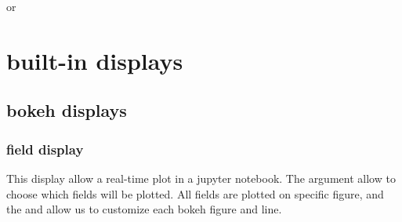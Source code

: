 \documentclass[letterpaper,10pt,english]{sphinxmanual}
\begin{document}
or

\begin{sphinxVerbatim}[commandchars=\\\{\}]
  
   
     
                     


    
\end{sphinxVerbatim}

\begin{sphinxVerbatim}[commandchars=\\\{\}]
  
  
  
  
  
\end{sphinxVerbatim}


\section{built-in displays}
\label{\detokenize{cookbook/displays:built-in-displays}}

\subsection{bokeh displays}
\label{\detokenize{cookbook/displays:bokeh-displays}}

\subsubsection{field display}
\label{\detokenize{cookbook/displays:field-display}}
This display allow a real-time plot in a jupyter notebook. The 
argument allow to choose which fields will be plotted. All fields are
plotted on specific figure, and the  and 
allow us to customize each bokeh figure and line.
\end{document}
